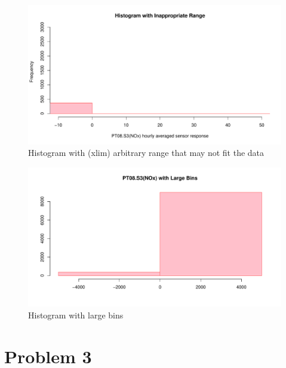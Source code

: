 \documentclass{article}
\begin{document}
\begin{figure}[H]
   \centering
   \includegraphics[width=\linewidth]{images/HistInappropRange.pdf}
   \caption{Histogram with (xlim) arbitrary range that may not fit the data}
   \label{fig:fig9}
\end{figure}
\begin{figure}[H]
   \centering
   \includegraphics[width=\linewidth]{images/PT08.s3LArgeBins.pdf}
   \caption{Histogram with large bins}
   \label{fig:fig10}
\end{figure}
\section{Problem 3}
\end{document}
